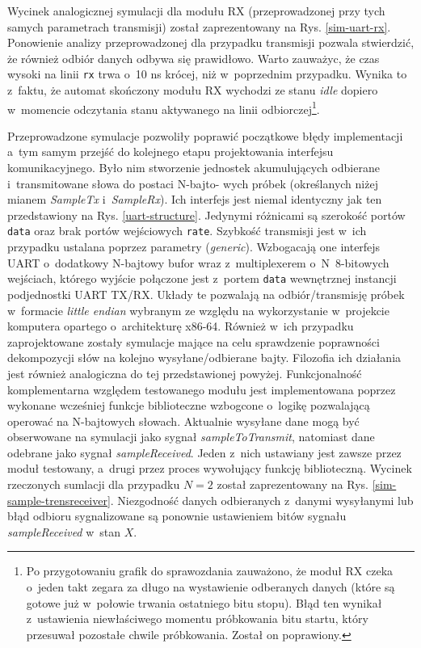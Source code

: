 Wycinek analogicznej symulacji dla modułu RX (przeprowadzonej przy tych samych parametrach transmisji) został zaprezentowany na Rys. \ref{sim-uart-rx}. Ponowienie analizy przeprowadzonej dla przypadku transmisji pozwala stwierdzić, że również odbiór danych odbywa się prawidłowo. Warto zauważyc, że czas wysoki na linii \verb|rx| trwa o~10 ns krócej, niż w~poprzednim przypadku. Wynika to z~faktu, że automat skończony modułu RX wychodzi ze stanu \textit{idle} dopiero w~momencie odczytania stanu aktywanego na linii odbiorczej\footnote{Po przygotowaniu grafik do sprawozdania zauważono, że moduł RX czeka o~jeden takt zegara za długo na wystawienie odberanych danych (które są gotowe już w~połowie trwania ostatniego bitu stopu). Błąd ten wynikał z~ustawienia niewłaściwego momentu próbkowania bitu startu, który przesuwał pozostałe chwile próbkowania. Został on poprawiony.}.

Przeprowadzone symulacje pozwoliły poprawić początkowe błędy implementacji a~tym samym przejść do kolejnego etapu projektowania interfejsu komunikacyjnego. Było nim stworzenie jednostek akumulujących odbierane i~transmitowane słowa do postaci N-bajto- wych próbek (określanych niżej mianem \textit{SampleTx} i~\textit{SampleRx}). Ich interfejs jest niemal identyczny jak ten przedstawiony na Rys. \ref{uart-structure}. Jedynymi różnicami są szerokość portów \verb|data| oraz brak portów wejściowych \verb|rate|. Szybkość transmisji jest w~ich przypadku ustalana poprzez parametry (\textit{generic}). Wzbogacają one interfejs UART o~dodatkowy N-bajtowy bufor wraz z~multiplexerem o~N~8-bitowych wejściach, którego wyjście połączone jest z~portem \verb|data| wewnętrznej instancji podjednostki UART TX/RX. Układy te pozwalają na odbiór/transmisję próbek w~formacie \textit{little endian} wybranym ze względu na wykorzystanie w~projekcie komputera opartego o~architekturę x86-64. Również w~ich przypadku zaprojektowane zostały symulacje mające na celu sprawdzenie poprawności dekompozycji słów na kolejno wysyłane/odbierane bajty. Filozofia ich działania jest również analogiczna do tej przedstawionej powyżej. Funkcjonalność komplementarna względem testowanego modułu jest implementowana poprzez wykonane wcześniej funkcje biblioteczne wzbogcone o~logikę pozwalającą operować na N-bajtowych słowach. Aktualnie wysyłane dane mogą być obserwowane na symulacji jako sygnał \textit{sampleToTransmit}, natomiast dane odebrane jako sygnał \textit{sampleReceived}. Jeden z~nich ustawiany jest zawsze przez moduł testowany, a~drugi przez proces wywołujący funkcję biblioteczną. Wycinek rzeczonych sumlacji dla przypadku $N=2$ został zaprezentowany na Rys. \ref{sim-sample-trensreceiver}. Niezgodność danych odbieranych z~danymi wysyłanymi lub błąd odbioru sygnalizowane są ponownie ustawieniem bitów sygnału \textit{sampleReceived} w~stan $X$.

